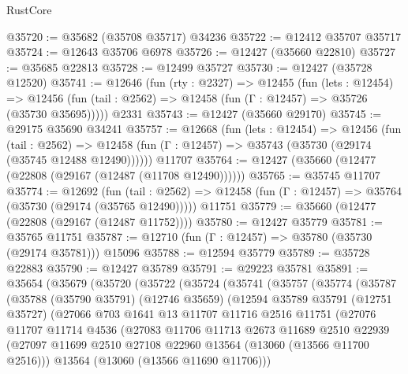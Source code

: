 \begin{lexlean}{RustCore}
\begin{coremodule}
@35720 := @35682 (@35708 @35717) @34236
@35722 := @12412 @35707 @35717
@35724 := @12643 @35706 @6978
@35726 := @12427 (@35660 @22810)
@35727 := @35685 @22813
@35728 := @12499 @35727
@35730 := @12427 (@35728 @12520)
@35741 := @12646
    (fun (rty : @2327) =>
    @12455
      (fun (lets : @12454) =>
      @12456 (fun (tail : @2562) => @12458 (fun (Γ : @12457) => @35726 (@35730 @35695)))))
    @2331
@35743 := @12427 (@35660 @29170)
@35745 := @29175 @35690 @34241
@35757 := @12668
    (fun (lets : @12454) =>
    @12456
      (fun (tail : @2562) =>
      @12458 (fun (Γ : @12457) => @35743 (@35730 (@29174 (@35745 @12488 @12490))))))
    @11707
@35764 := @12427 (@35660 (@12477 (@22808 (@29167 (@12487 (@11708 @12490))))))
@35765 := @35745 @11707
@35774 := @12692
    (fun (tail : @2562) => @12458 (fun (Γ : @12457) => @35764 (@35730 (@29174 (@35765 @12490)))))
    @11751
@35779 := @35660 (@12477 (@22808 (@29167 (@12487 @11752))))
@35780 := @12427 @35779
@35781 := @35765 @11751
@35787 := @12710 (fun (Γ : @12457) => @35780 (@35730 (@29174 @35781))) @15096
@35788 := @12594 @35779
@35789 := @35728 @22883
@35790 := @12427 @35789
@35791 := @29223 @35781
@35891 := @35654
    (@35679
      (@35720
        (@35722
          (@35724
            (@35741
              (@35757
                (@35774
                  (@35787
                    (@35788
                      (@35790 @35791)
                      (@12746 @35659)
                      (@12594
                        @35789
                        @35791
                        (@12751 @35727)
                        (@27066
                          @703
                          @1641
                          @13
                          @11707
                          @11716
                          @2516
                          @11751
                          (@27076
                            @11707
                            @11714
                            @4536
                            (@27083
                              @11706
                              @11713
                              @2673
                              @11689
                              @2510
                              @22939
                              (@27097
                                @11699
                                @2510
                                @27108
                                @22960
                                @13564
                                (@13060 (@13566 @11700 @2516)))
                              @13564
                              (@13060 (@13566 @11690 @11706)))

\end{coremodule}
\end{lexlean}

